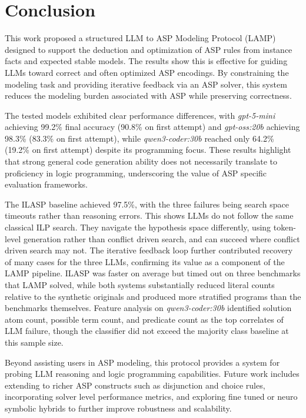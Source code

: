 \documentclass[11pt,a4paper]{article}
\begin{document}
\section{Conclusion}

This work proposed a structured LLM to ASP Modeling Protocol (LAMP) designed to support the deduction and optimization of ASP rules from instance facts and expected stable models. The results show this is effective for guiding LLMs toward correct and often optimized ASP encodings. By constraining the modeling task and providing iterative feedback via an ASP solver, this system reduces the modeling burden associated with ASP while preserving correctness.

The tested models exhibited clear performance differences, with \textit{gpt-5-mini} achieving 99.2\% final accuracy (90.8\% on first attempt) and \textit{gpt-oss:20b} achieving 98.3\% (83.3\% on first attempt), while \textit{qwen3-coder:30b} reached only 64.2\% (19.2\% on first attempt) despite its programming focus. These results highlight that strong general code generation ability does not necessarily translate to proficiency in logic programming, underscoring the value of ASP specific evaluation frameworks.

The ILASP baseline achieved 97.5\%, with the three failures being search space timeouts rather than reasoning errors. This shows LLMs do not follow the same classical ILP search. They navigate the hypothesis space differently, using token-level generation rather than conflict driven search, and can succeed where conflict driven search may not. The iterative feedback loop further contributed recovery of many cases for the three LLMs, confirming its value as a component of the LAMP pipeline. ILASP was faster on average but timed out on three benchmarks that LAMP solved, while both systems substantially reduced literal counts relative to the synthetic originals and produced more stratified programs than the benchmarks themselves. Feature analysis on \textit{qwen3-coder:30b} identified solution atom count, possible term count, and predicate count as the top correlates of LLM failure, though the classifier did not exceed the majority class baseline at this sample size.

Beyond assisting users in ASP modeling, this protocol provides a system for probing LLM reasoning and logic programming capabilities. Future work includes extending to richer ASP constructs such as disjunction and choice rules, incorporating solver level performance metrics, and exploring fine tuned or neuro symbolic hybrids to further improve robustness and scalability.



\end{document}
